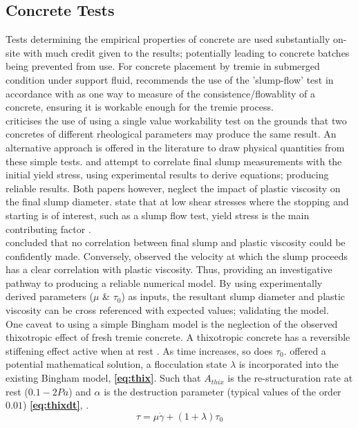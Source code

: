 \subsection{Concrete Tests}
Tests determining the empirical properties of concrete are used substantially on-site with much credit given to the results; potentially leading to concrete batches being prevented from use. For concrete placement by tremie in submerged condition under support fluid, \citet{Sperwall} recommends the use of the 'slump-flow' test in accordance with \citeauthor{BS123508} as one way to measure of the consistence/flowablity of a concrete, ensuring it is workable enough for the tremie process.\\
\newline
\noindent
\citet{wallevik06} criticises the use of using a single value workability test on the grounds that two concretes of different rheological parameters may produce the same result. An alternative approach is offered in the literature to draw physical quantities from these simple tests. \citet{roussel50} and \citet{wallevik06} attempt to correlate final slump measurements with the initial yield stress, using experimental results to derive equations; producing reliable results. Both papers however, neglect the impact of plastic viscosity on the final slump diameter. \citet{sofcf} state that at low shear stresses where the stopping and starting is of interest, such as a slump flow test, yield stress is the main contributing factor \citep{sofcf}.\\
\newline
\noindent
\citet{wallevik06} concluded that no correlation between final slump and plastic viscosity could be confidently made. Conversely, \citet{TUM} observed the velocity at which the slump proceeds has a clear correlation with plastic viscosity. Thus, providing an investigative pathway to producing a reliable numerical model. By using experimentally derived parameters ($\mu$ \& $\tau_0$) as inputs, the resultant slump diameter and plastic viscosity can be cross referenced with expected values; validating the model.\\
\newline
One caveat to using a simple Bingham model is the neglection of the observed thixotropic effect of fresh tremie concrete. A thixotropic concrete has a reversible stiffening effect active when at rest \citep{EFFC}. As time increases, so does $\tau_0$. \citet{roussel06} offered a potential mathematical solution, a flocculation state $\lambda$ is incorporated into the existing Bingham model, {\bfseries \ref{eq:thix}}. Such that $A_{thix}$ is the re-structuration rate at rest ($0.1-2 Pa$) and $\alpha$ is the destruction parameter (typical values of the order $0.01$) {\bfseries \ref{eq:thixdt}}, \citet{roussel07}.
\begin{equation}
\tau = \mu\dot{\gamma}+(1+\lambda)\tau_0
\label{eq:thix}
\end{equation}

